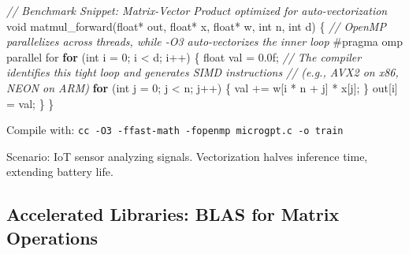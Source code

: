 \documentclass[
]{article}
\newenvironment{Shaded}{}{}
\newcommand{\BuiltInTok}[1]{\textcolor[rgb]{0.00,0.50,0.00}{#1}}
\newcommand{\CommentTok}[1]{\textcolor[rgb]{0.38,0.63,0.69}{\textit{#1}}}
\newcommand{\ControlFlowTok}[1]{\textcolor[rgb]{0.00,0.44,0.13}{\textbf{#1}}}
\newcommand{\DataTypeTok}[1]{\textcolor[rgb]{0.56,0.13,0.00}{#1}}
\newcommand{\DecValTok}[1]{\textcolor[rgb]{0.25,0.63,0.44}{#1}}
\newcommand{\FloatTok}[1]{\textcolor[rgb]{0.25,0.63,0.44}{#1}}
\newcommand{\NormalTok}[1]{#1}
\newcommand{\OperatorTok}[1]{\textcolor[rgb]{0.40,0.40,0.40}{#1}}
\newcommand{\PreprocessorTok}[1]{\textcolor[rgb]{0.74,0.48,0.00}{#1}}
\begin{document}
\begin{Shaded}
\begin{Highlighting}[]
\CommentTok{// Benchmark Snippet: Matrix{-}Vector Product optimized for auto{-}vectorization}
\DataTypeTok{void}\NormalTok{ matmul\_forward}\OperatorTok{(}\DataTypeTok{float}\OperatorTok{*}\NormalTok{ out}\OperatorTok{,} \DataTypeTok{float}\OperatorTok{*}\NormalTok{ x}\OperatorTok{,} \DataTypeTok{float}\OperatorTok{*}\NormalTok{ w}\OperatorTok{,} \DataTypeTok{int}\NormalTok{ n}\OperatorTok{,} \DataTypeTok{int}\NormalTok{ d}\OperatorTok{)} \OperatorTok{\{}
    \CommentTok{// OpenMP parallelizes across threads, while {-}O3 auto{-}vectorizes the inner loop}
    \PreprocessorTok{\#pragma omp parallel for}
    \ControlFlowTok{for} \OperatorTok{(}\DataTypeTok{int}\NormalTok{ i }\OperatorTok{=} \DecValTok{0}\OperatorTok{;}\NormalTok{ i }\OperatorTok{\textless{}}\NormalTok{ d}\OperatorTok{;}\NormalTok{ i}\OperatorTok{++)} \OperatorTok{\{}
        \DataTypeTok{float}\NormalTok{ val }\OperatorTok{=} \FloatTok{0.0}\BuiltInTok{f}\OperatorTok{;}
        \CommentTok{// The compiler identifies this tight loop and generates SIMD instructions}
        \CommentTok{// (e.g., AVX2 on x86, NEON on ARM)}
        \ControlFlowTok{for} \OperatorTok{(}\DataTypeTok{int}\NormalTok{ j }\OperatorTok{=} \DecValTok{0}\OperatorTok{;}\NormalTok{ j }\OperatorTok{\textless{}}\NormalTok{ n}\OperatorTok{;}\NormalTok{ j}\OperatorTok{++)} \OperatorTok{\{}
\NormalTok{            val }\OperatorTok{+=}\NormalTok{ w}\OperatorTok{[}\NormalTok{i }\OperatorTok{*}\NormalTok{ n }\OperatorTok{+}\NormalTok{ j}\OperatorTok{]} \OperatorTok{*}\NormalTok{ x}\OperatorTok{[}\NormalTok{j}\OperatorTok{];}
        \OperatorTok{\}}
\NormalTok{        out}\OperatorTok{[}\NormalTok{i}\OperatorTok{]} \OperatorTok{=}\NormalTok{ val}\OperatorTok{;}
    \OperatorTok{\}}
\OperatorTok{\}}
\end{Highlighting}
\end{Shaded}

Compile with:
\texttt{cc\ -O3\ -ffast-math\ -fopenmp\ microgpt.c\ -o\ train}

Scenario: IoT sensor analyzing signals. Vectorization halves inference
time, extending battery life.

\subsection{Accelerated Libraries: BLAS for Matrix
Operations}\label{accelerated-libraries-blas-for-matrix-operations}
\end{document}
